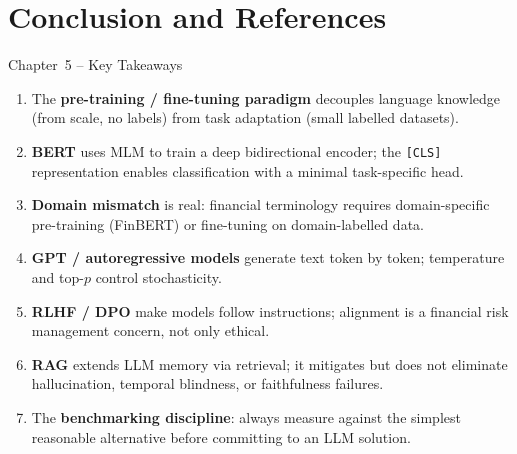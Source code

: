 \documentclass[11pt,aspectratio=169,professionalfonts]{beamer}
\begin{document}
\section{Conclusion and References}
%
\begin{frame}{Chapter~5 -- Key Takeaways}
  \begin{enumerate}
    \item The \textbf{pre-training / fine-tuning paradigm} decouples
          language knowledge (from scale, no labels) from task adaptation
          (small labelled datasets).
    \item \textbf{BERT} uses MLM to train a deep bidirectional encoder;
          the \texttt{[CLS]} representation enables classification
          with a minimal task-specific head.
    \item \textbf{Domain mismatch} is real: financial terminology requires
          domain-specific pre-training (FinBERT) or fine-tuning on
          domain-labelled data.
    \item \textbf{GPT / autoregressive models} generate text token by token;
          temperature and top-$p$ control stochasticity.
    \item \textbf{RLHF / DPO} make models follow instructions;
          alignment is a financial risk management concern, not only ethical.
    \item \textbf{RAG} extends LLM memory via retrieval; it mitigates but
          does not eliminate hallucination, temporal blindness, or
          faithfulness failures.
    \item The \textbf{benchmarking discipline}: always measure against the
          simplest reasonable alternative before committing to an LLM solution.
  \end{enumerate}
\end{frame}
%
%
\end{document}

